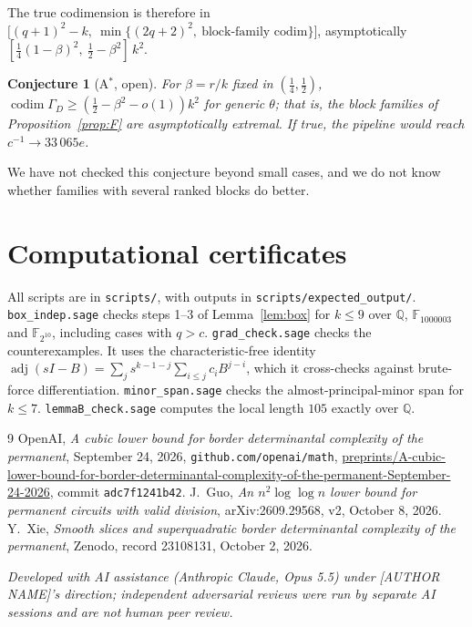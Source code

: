 \documentclass[11pt]{amsart}
\newtheorem{conjecture}[theorem]{Conjecture}
\theoremstyle{remark}
\DeclareMathOperator{\adj}{adj}
\DeclareMathOperator{\codim}{codim}
\begin{document}
The true codimension is therefore in
$\bigl[(q+1)^2-k,\ \min\{(2q+2)^2,\ \text{block-family codim}\}\bigr]$,
asymptotically $[\tfrac14(1-\beta)^2,\ \tfrac12-\beta^2]\,k^2$.

\begin{conjecture}[A$^*$, open]
For $\beta=r/k$ fixed in $(\tfrac14,\tfrac12)$,
$\codim\Gamma_D\ge(\tfrac12-\beta^2-o(1))k^2$ for generic $\theta$; that is,
the block families of Proposition~\ref{prop:F} are asymptotically extremal.
If true, the pipeline would reach $c^{-1}\to33\,065e$.
\end{conjecture}
We have not checked this conjecture beyond small cases, and we do not know
whether families with several ranked blocks do better.

\section{Computational certificates}
All scripts are in \texttt{scripts/}, with outputs in
\texttt{scripts/expected\_output/}. \texttt{box\_indep.sage} checks steps 1--3
of Lemma~\ref{lem:box} for $k\le9$ over $\mathbb Q$, $\mathbb F_{1000003}$ and
$\mathbb F_{2^{10}}$, including cases with $q>c$. \texttt{grad\_check.sage}
checks the counterexamples. It uses the characteristic-free identity
$\adj(sI-B)=\sum_j s^{k-1-j}\sum_{i\le j}c_iB^{j-i}$, which it cross-checks
against brute-force differentiation. \texttt{minor\_span.sage} checks the
almost-principal-minor span for $k\le7$. \texttt{lemmaB\_check.sage} computes
the local length $105$ exactly over $\mathbb Q$.

\begin{thebibliography}{9}
 OpenAI, \emph{A cubic lower bound for border determinantal
complexity of the permanent}, September 24, 2026,
\texttt{github.com/openai/math}, \url{preprints/A-cubic-lower-bound-for-border-determinantal-complexity-of-the-permanent-September-24-2026}, commit \texttt{adc7f1241b42}.
 J.~Guo, \emph{An $n^2\log\log n$ lower bound for permanent
circuits with valid division}, arXiv:2609.29568, v2, October 8, 2026.
 Y.~Xie, \emph{Smooth slices and superquadratic border
determinantal complexity of the permanent}, Zenodo, record 23108131,
October 2, 2026.
\end{thebibliography}

\medskip\noindent\emph{Developed with AI assistance (Anthropic Claude, Opus 5.5)
under [AUTHOR NAME]'s direction; independent adversarial reviews were run by
separate AI sessions and are not human peer review.}
\end{document}
